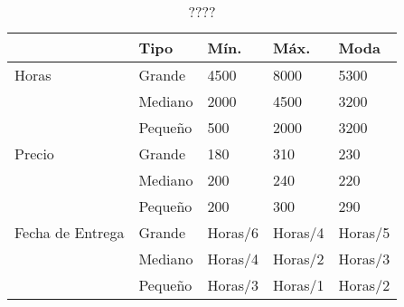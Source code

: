 \begin{table}[H]

\begin{center}

\begin{tabular}{|l|l|l|l|l|}
\hline
                    & Tipo      & Mín.    & Máx.    & Moda\\
\hline
    Horas           & Grande    & 4500    & 8000    & 5300\\
\hline
                    & Mediano   & 2000    & 4500    & 3200\\
\hline
                    & Pequeño   & 500     & 2000    & 3200\\
\hline
    Precio          & Grande    & 180     & 310     & 230\\
\hline
                    & Mediano   & 200     & 240     & 220\\
\hline
                    & Pequeño   & 200     & 300     & 290\\
\hline
    Fecha de Entrega& Grande    & Horas/6 & Horas/4 & Horas/5\\
\hline
                    & Mediano   & Horas/4 & Horas/2 & Horas/3\\
\hline
                    & Pequeño   & Horas/3 & Horas/1 & Horas/2\\
\hline
\end{tabular}

\end{center}

\caption{????}
\label{tab:va}


\end{table}

